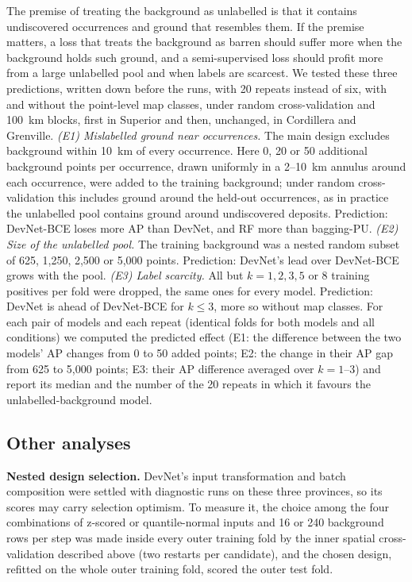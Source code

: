 \documentclass[pdflatex,sn-apa]{sn-jnl}
\begin{document}
The premise of treating the background as unlabelled is that it contains undiscovered occurrences and ground that resembles them. If the premise matters, a loss that treats the background as barren should suffer more when the background holds such ground, and a semi-supervised loss should profit more from a large unlabelled pool and when labels are scarcest. We tested these three predictions, written down before the runs, with 20 repeats instead of six, with and without the point-level map classes, under random cross-validation and 100~km blocks, first in Superior and then, unchanged, in Cordillera and Grenville.
\textit{(E1) Mislabelled ground near occurrences.} The main design excludes background within 10~km of every occurrence. Here 0, 20 or 50 additional background points per occurrence, drawn uniformly in a 2--10~km annulus around each occurrence, were added to the training background; under random cross-validation this includes ground around the held-out occurrences, as in practice the unlabelled pool contains ground around undiscovered deposits. Prediction: DevNet-BCE loses more AP than DevNet, and RF more than bagging-PU.
\textit{(E2) Size of the unlabelled pool.} The training background was a nested random subset of 625, 1,250, 2,500 or 5,000 points. Prediction: DevNet's lead over DevNet-BCE grows with the pool.
\textit{(E3) Label scarcity.} All but $k = 1, 2, 3, 5$ or 8 training positives per fold were dropped, the same ones for every model. Prediction: DevNet is ahead of DevNet-BCE for $k \leq 3$, more so without map classes.
For each pair of models and each repeat (identical folds for both models and all conditions) we computed the predicted effect (E1: the difference between the two models' AP changes from 0 to 50 added points; E2: the change in their AP gap from 625 to 5,000 points; E3: their AP difference averaged over $k = 1$--3) and report its median and the number of the 20 repeats in which it favours the unlabelled-background model.

\subsection{Other analyses}\label{sec:robust-methods}

\textbf{Nested design selection.} DevNet's input transformation and batch composition were settled with diagnostic runs on these three provinces, so its scores may carry selection optimism. To measure it, the choice among the four combinations of z-scored or quantile-normal inputs and 16 or 240 background rows per step was made inside every outer training fold by the inner spatial cross-validation described above (two restarts per candidate), and the chosen design, refitted on the whole outer training fold, scored the outer test fold.
\end{document}
